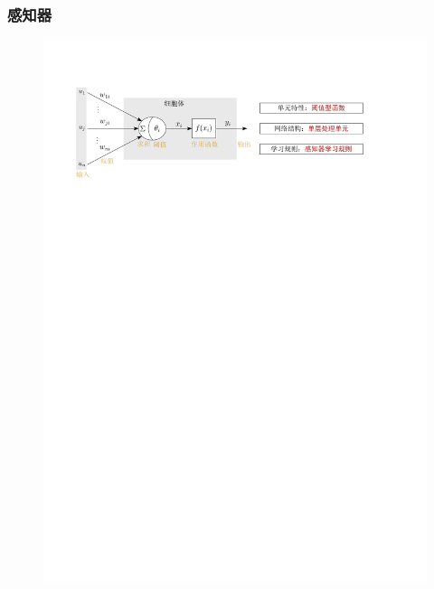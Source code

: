 \subsubsection{感知器}
\begin{figure}[htbp]
    \centering
    \includegraphics[width = .9\textwidth]{image/单层感知器的三要素.pdf}
\end{figure}
